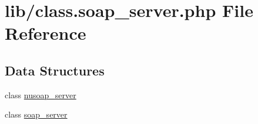 \hypertarget{class_8soap__server_8php}{}\section{lib/class.soap\+\_\+server.\+php File Reference}
\label{class_8soap__server_8php}
\subsection*{Data Structures}
\begin{DoxyCompactItemize}
\item 
class \hyperlink{classnusoap__server}{nusoap\+\_\+server}
\item 
class \hyperlink{classsoap__server}{soap\+\_\+server}
\end{DoxyCompactItemize}
